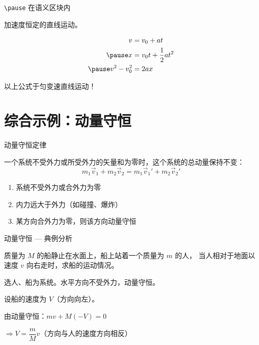 \documentclass[darkmode=false, randomquote=true, quoteseed=2026, shownav=false,handout=false]{HiBeamer}
\begin{document}
\begin{frame}{\texttt{\textbackslash pause} 在语义区块内}
  \begin{defn}[匀变速直线运动]
    加速度恒定的直线运动。
  \end{defn}

  \pause

  \begin{thm}[运动学公式]
    \begin{align*}
      v &= v_0 + at                \\
      \pause
      x &= v_0 t + \frac{1}{2}at^2 \\
      \pause
      v^2 - v_0^2 &= 2ax
    \end{align*}
  \end{thm}

  \pause

  \begin{warn}
    以上公式于匀变速直线运动！
  \end{warn}
\end{frame}

\section{综合示例：动量守恒}

\begin{frame}{动量守恒定律}
  \begin{thm}[动量守恒定律]
    一个系统不受外力或所受外力的矢量和为零时，这个系统的总动量保持不变：
    \[ m_1 \vec{v}_1 + m_2 \vec{v}_2 = m_1 \vec{v}_1' + m_2 \vec{v}_2' \]
  \end{thm}

  \begin{imp}[适用条件]
    \begin{enumerate}
      \item 系统不受外力或合外力为零
      \item 内力远大于外力（如碰撞、爆炸）
      \item 某方向合外力为零，则该方向动量守恒
    \end{enumerate}
  \end{imp}
\end{frame}

\begin{frame}{动量守恒 --- 典例分析}
  \begin{eg}[人船模型]
    质量为 $M$ 的船静止在水面上，船上站着一个质量为 $m$ 的人，
    当人相对于地面以速度 $v$ 向右走时，求船的运动情况。
  \end{eg}

  \begin{solve}
    选人、船为系统。水平方向不受外力，动量守恒。

    设船的速度为 $V$（方向向左）。

    由动量守恒：$mv + M(-V) = 0$

    $\Rightarrow V = \dfrac{m}{M}v$（方向与人的速度方向相反）
  \end{solve}
\end{frame}
\end{document}
